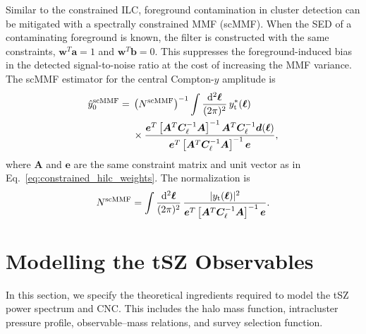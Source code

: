 \documentclass[aps,prd,twocolumn,superscriptaddress,nofootinbib,floatfix]{revtex4-2}
\begin{document}
Similar to the constrained ILC, foreground contamination in cluster detection can be mitigated with a spectrally constrained MMF (scMMF). When the SED of a contaminating foreground is known, the filter is constructed with the same constraints, $\bm{w}^{T}\bm{a}=1$ and $\bm{w}^{T}\bm{b}=0$. This suppresses the foreground-induced bias in the detected signal-to-noise ratio at the cost of increasing the MMF variance. The scMMF estimator for the central Compton-$y$ amplitude is
\begin{equation}
\begin{aligned}
\hat{y}_0^{\rm scMMF}
={}&
\left(N^{\rm scMMF}\right)^{-1}
\int
\frac{\mathrm{d}^2\bm{\ell}}{(2\pi)^2}\,
y_{\rm t}^{*}(\bm{\ell})
\\
&\times
\frac{
\bm{e}^{T}
\left[
\bm{A}^{T}
\bm{C}_{\ell}^{-1}
\bm{A}
\right]^{-1}
\bm{A}^{T}
\bm{C}_{\ell}^{-1}
\bm{d}(\bm{\ell})
}{
\bm{e}^{T}
\left[
\bm{A}^{T}
\bm{C}_{\ell}^{-1}
\bm{A}
\right]^{-1}
\bm{e}
},
\end{aligned}
\label{eq:scmmf_estimator}
\end{equation}
where $\bm{A}$ and $\bm{e}$ are the same constraint matrix and unit vector as in Eq.~\eqref{eq:constrained_hilc_weights}. The normalization is
\begin{equation}
N^{\rm scMMF}
=
\int
\frac{\mathrm{d}^2\bm{\ell}}{(2\pi)^2}\,
\frac{
|y_{\rm t}(\bm{\ell})|^2
}{
\bm{e}^{T}
\left[
\bm{A}^{T}
\bm{C}_{\ell}^{-1}
\bm{A}
\right]^{-1}
\bm{e}
}.
\label{eq:scmmf_normalization}
\end{equation}


\section{Modelling the tSZ Observables}
\label{sec:modelling}
In this section, we specify the theoretical ingredients required to model the tSZ power spectrum and CNC. This includes the halo mass function, intracluster pressure profile, observable--mass relations, and survey selection function.

\end{document}
